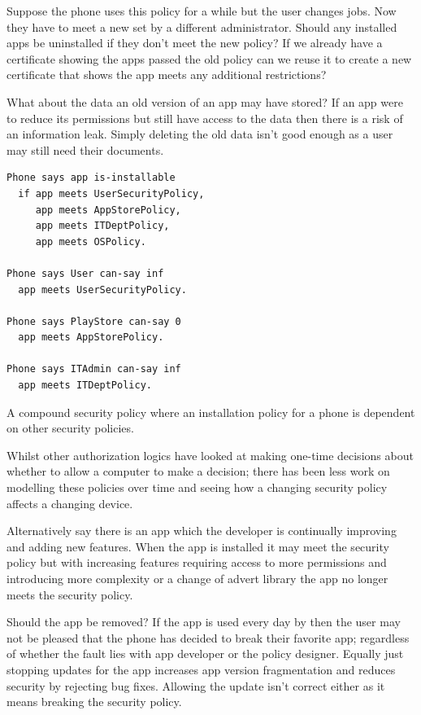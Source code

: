 \documentclass[a4paper,sfsidenotes]{%
  scrartcl%
}
\begin{document}
Suppose the phone uses this policy for a while but the user changes jobs.
Now they have to meet a new  set by a different administrator.
Should any installed apps be uninstalled if they don't meet the new policy?  If
we already have a certificate showing the apps passed the old policy can we
reuse it to create a new certificate that shows the app meets any additional
restrictions? 

What about the data an old version of an app may have stored?  If
an app were to reduce its permissions but still have access to the data then
there is a risk of an information leak.  Simply deleting the old data isn't good
enough as a user may still need their documents.

\begin{marginfigure}  
  \begin{lstlisting}[language=SecPAL]
Phone says app is-installable
  if app meets UserSecurityPolicy,
     app meets AppStorePolicy,
     app meets ITDeptPolicy,
     app meets OSPolicy.

Phone says User can-say inf
  app meets UserSecurityPolicy.

Phone says PlayStore can-say 0
  app meets AppStorePolicy.

Phone says ITAdmin can-say inf
  app meets ITDeptPolicy.
  \end{lstlisting}
  \caption[Example compound security policy.]{A compound security policy where an installation policy for a
    phone is dependent on other security policies.}
  \label{example:composition}
\end{marginfigure}
     
Whilst other authorization logics have looked at making one-time decisions about
whether to allow a computer to make a decision; there has been less work on
modelling these policies over time and seeing how a changing security policy
affects a changing device.

Alternatively say there is an app which the developer is continually improving
and adding new features.  When the app is installed it may meet the security
policy but with increasing features requiring access to more permissions and
introducing more complexity or a change of advert library the app no longer
meets the security policy.

Should the app be removed?  If the app is used every day by then the user may
not be pleased that the phone has decided to break their favorite
app; regardless of whether the fault lies with app developer or the policy
designer. Equally just stopping updates for the app increases app
version fragmentation and reduces security by rejecting bug fixes.  Allowing the
update isn't correct either as it means breaking the security policy.
\end{document}
